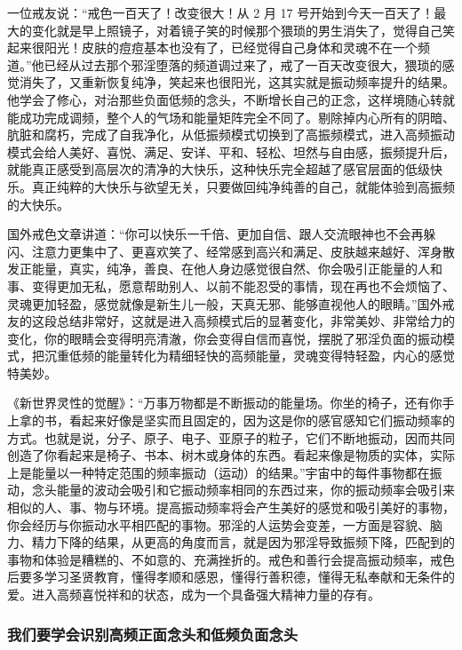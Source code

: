 一位戒友说：“戒色一百天了！改变很大！从 2 月 17 号开始到今天一百天了！最大的变化就是早上照镜子，对着镜子笑的时候那个猥琐的男生消失了，觉得自己笑起来很阳光！皮肤的痘痘基本也没有了，已经觉得自己身体和灵魂不在一个频道。”他已经从过去那个邪淫堕落的频道调过来了，戒了一百天改变很大，猥琐的感觉消失了，又重新恢复纯净，笑起来也很阳光，这其实就是振动频率提升的结果。他学会了修心，对治那些负面低频的念头，不断增长自己的正念，这样境随心转就能成功完成调频，整个人的气场和能量矩阵完全不同了。剔除掉内心所有的阴暗、肮脏和腐朽，完成了自我净化，从低振频模式切换到了高振频模式，进入高频振动模式会给人美好、喜悦、满足、安详、平和、轻松、坦然与自由感，振频提升后，就能真正感受到高层次的清净的大快乐，这种快乐完全超越了感官层面的低级快乐。真正纯粹的大快乐与欲望无关，只要做回纯净纯善的自己，就能体验到高振频的大快乐。

国外戒色文章讲道：“你可以快乐一千倍、更加自信、跟人交流眼神也不会再躲闪、注意力更集中了、更喜欢笑了、经常感到高兴和满足、皮肤越来越好、浑身散发正能量，真实，纯净，善良、在他人身边感觉很自然、你会吸引正能量的人和事、变得更加无私，愿意帮助别人、以前不能忍受的事情，现在再也不会烦恼了、灵魂更加轻盈，感觉就像是新生儿一般，天真无邪、能够直视他人的眼睛。”国外戒友的这段总结非常好，这就是进入高频模式后的显著变化，非常美妙、非常给力的变化，你的眼睛会变得明亮清澈，你会变得自信而喜悦，摆脱了邪淫负面的振动模式，把沉重低频的能量转化为精细轻快的高频能量，灵魂变得特轻盈，内心的感觉特美妙。

《新世界灵性的觉醒》：“万事万物都是不断振动的能量场。你坐的椅子，还有你手上拿的书，看起来好像是坚实而且固定的，因为这是你的感官感知它们振动频率的方式。也就是说，分子、原子、电子、亚原子的粒子，它们不断地振动，因而共同创造了你看起来是椅子、书本、树木或身体的东西。看起来像是物质的实体，实际上是能量以一种特定范围的频率振动（运动）的结果。”宇宙中的每件事物都在振动，念头能量的波动会吸引和它振动频率相同的东西过来，你的振动频率会吸引来相似的人、事、物与环境。提高振动频率将会产生美好的感觉和吸引美好的事物，你会经历与你振动水平相匹配的事物。邪淫的人运势会变差，一方面是容貌、脑力、精力下降的结果，从更高的角度而言，就是因为邪淫导致振频下降，匹配到的事物和体验是糟糕的、不如意的、充满挫折的。戒色和善行会提高振动频率，戒色后要多学习圣贤教育，懂得孝顺和感恩，懂得行善积德，懂得无私奉献和无条件的爱。进入高频喜悦祥和的状态，成为一个具备强大精神力量的存有。

\subsubsection{我们要学会识别高频正面念头和低频负面念头}

